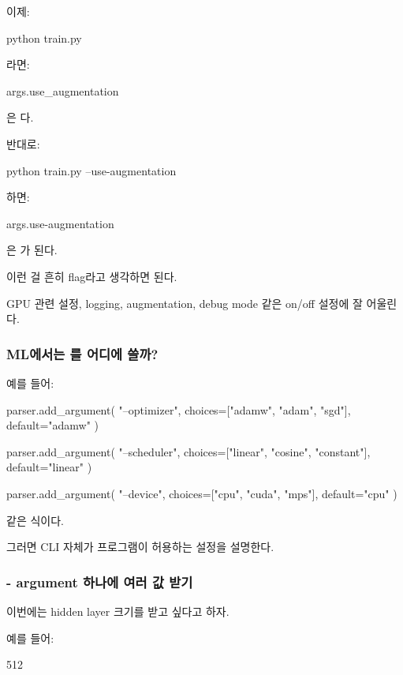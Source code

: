 이제:

\begin{dhkzsh}
python train.py
\end{dhkzsh}

라면:

\begin{dhkcode}
args.use_augmentation
\end{dhkcode}

은 다.

반대로:

\begin{dhkzsh}
python train.py --use-augmentation
\end{dhkzsh}

하면:

\begin{dhkcode}
args.use-augmentation
\end{dhkcode}

은 가 된다.

이런 걸 흔히 flag라고 생각하면 된다.

GPU 관련 설정, logging, augmentation, debug mode 같은 on/off 설정에 잘 어울린다.

\subsubsection{ML에서는 를 어디에 쓸까?}

예를 들어:

\begin{dhkcode}
parser.add_argument(
    "--optimizer",
    choices=["adamw", "adam", "sgd"],
    default="adamw"
)

parser.add_argument(
    "--scheduler",
    choices=["linear", "cosine", "constant"],
    default="linear"
)

parser.add_argument(
    "--device",
    choices=["cpu", "cuda", "mps"],
    default="cpu"
)
\end{dhkcode}

같은 식이다.

그러면 CLI 자체가 프로그램이 허용하는 설정을 설명한다.

\subsubsection{ - argument 하나에 여러 값 받기}

이번에는 hidden layer 크기를 받고 싶다고 하자.

예를 들어:

\begin{dhksmry}[centered]
512  
\end{dhksmry}

